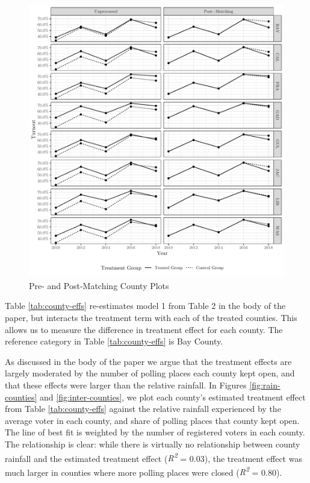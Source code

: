 \documentclass[
  12pt,
]{article}
\begin{document}
\begin{figure}[H]

{\centering \includegraphics{si_files/figure-latex/indcs-chunk-1} 

}

\caption{\label{fig:ind-counties}Pre- and Post-Matching County Plots}\label{fig:indcs-chunk}
\end{figure}

Table \ref{tab:county-effs} re-estimates model 1 from Table 2 in the body of the paper, but interacts the treatment term with each of the treated counties. This allows us to measure the difference in treatment effect for each county. The reference category in Table \ref{tab:county-effs} is Bay County.

\begin{singlespace}

\end{singlespace}

As discussed in the body of the paper we argue that the treatment effects are largely moderated by the number of polling places each county kept open, and that these effects were larger than the relative rainfall. In Figures \ref{fig:rain-counties} and \ref{fig:inter-counties}, we plot each county's estimated treatment effect from Table \ref{tab:county-effs} against the relative rainfall experienced by the average voter in each county, and share of polling places that county kept open. The line of best fit is weighted by the number of registered voters in each county. The relationship is clear: while there is virtually no relationship between county rainfall and the estimated treatment effect (\emph{R\textsuperscript{2}} = 0.03), the treatment effect was much larger in counties where more polling places were closed (\emph{R\textsuperscript{2}} = 0.80).
\end{document}
